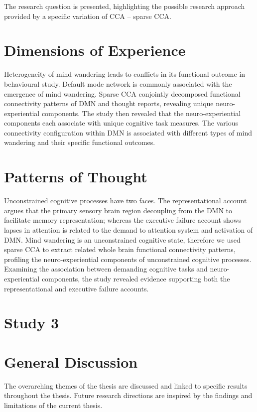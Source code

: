 The research question is presented, highlighting the possible research approach provided by a specific variation of CCA – sparse CCA. 

\section{Dimensions of Experience}

Heterogeneity of mind wandering leads to conflicts in its functional outcome in behavioural study. Default mode network is commonly associated with the emergence of mind wandering. Sparse CCA conjointly decomposed functional connectivity patterns of DMN and thought reports, revealing unique neuro-experiential components. The study then revealed that the neuro-experiential components each associate with unique cognitive task measures. The various connectivity configuration within DMN is associated with different types of mind wandering and their specific functional outcomes.

\section{Patterns of Thought}

Unconstrained cognitive processes have two faces. The representational account argues that the primary sensory brain region decoupling from the DMN to facilitate memory representation; whereas the executive failure account shows lapses in attention is related to the demand to attention system and activation of DMN. Mind wandering is an unconstrained cognitive state, therefore we used sparse CCA to extract related whole brain functional connectivity patterns, profiling the neuro-experiential components of unconstrained cognitive processes. Examining the association between demanding cognitive tasks and neuro-experiential components, the study revealed evidence supporting both the representational and executive failure accounts.

\section{Study 3}

\lorem

\section{General Discussion}

The overarching themes of the thesis are discussed and linked to specific results throughout the thesis. Future research directions are inspired by the findings and limitations of the current thesis.

